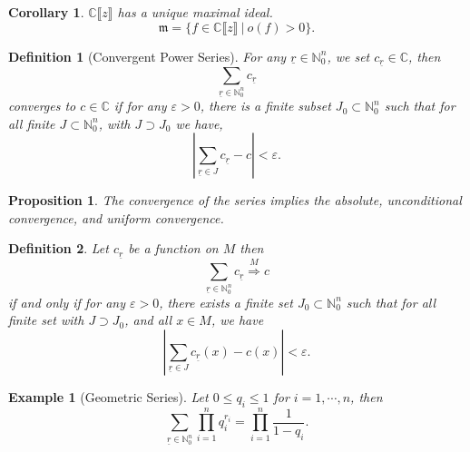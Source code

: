 \documentclass{article}
\newtheorem{proposition}{Proposition}[section]
\newtheorem{definition}{Definition}[section]
\newtheorem{corollary}{Corollary} [section]
\newtheorem{example}{Example}[section]
\newcommand{\N}[0]{\mathbb{N}}
\newcommand{\C}[0]{\mathbb{C}}
\newcommand{\sep}[0]{\:|\:}
\newcommand{\order}[0]{o}
\begin{document}
\begin{corollary}
  $\C\llbracket z\rrbracket$ has a unique maximal ideal.
  \begin{equation*}
  \mathfrak{m} = \{f\in\C\llbracket z\rrbracket\sep \order(f)>0\}.
  \end{equation*}
\end{corollary}

\begin{definition}[Convergent Power Series]
  For any $\underline{r}\in\N_0^n$, we set $c_{\underline{r}}\in\C$, then 
  \begin{equation*}
    \sum_{\underline{r}\in\N^n_0}c_{\underline{r}}
  \end{equation*}
  converges to $c\in \C$ if for any $\varepsilon>0$, there is a finite subset $J_0\subset\N_0^n$ such that for all finite $J\subset\N_0^n$, with $ J\supset J_0$ we have,
  \begin{equation*}
    \left\vert\sum_{\underline{r}\in J} c_{\underline{r}}-c\right\vert <\varepsilon.
  \end{equation*}
\end{definition}

\begin{proposition}
  The convergence of the series implies the absolute, unconditional convergence, and uniform convergence.
\end{proposition}

\begin{definition}
  Let $c_{\underline{r}}$ be a function on $M$ then 
  \begin{equation*}
    \sum_{\underline{r}\in\N_0^n}c_{\underline{r}} \stackrel{M}{\Rightarrow} c
  \end{equation*}
  if and only if for any $\varepsilon>0$, there exists a finite set $J_0\subset\N_0^n$ such that for all finite set with $J\supset J_0$,
  and all $x\in M$, we have 
  \begin{equation*}
    \left\vert\sum_{\underline{r}\in J}c_{\underline{r}}(x)-c(x)\right\vert <\varepsilon.
  \end{equation*}
\end{definition}

\begin{example}[Geometric Series]
  Let $0\leq q_i\leq 1$ for $i=1,\cdots,n$, then 
  \begin{equation*}
    \sum_{\underline{r}\in\N_0^n}\prod_{i=1}^n q_i^{r_i} = \prod_{i=1}^n{\frac 1 {1-q_i}}.
  \end{equation*}
\end{example}
\end{document}
